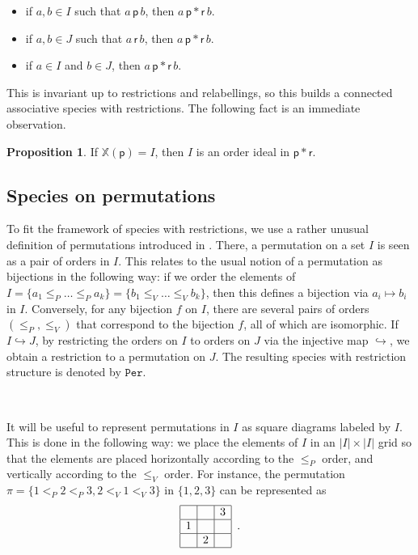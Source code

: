\documentclass[12pt, reqno]{amsart}
\theoremstyle{definition}
\newtheorem{prop}[thm]{Proposition}
\begin{document}
\begin{itemize}
\item if $a, b \in I$ such that $a \, \mathsf{p} \, b$, then $a \, \mathsf{p} \ast \mathsf{r} \, b$.

\item if $a, b \in J$ such that $a \, \mathsf{r} \, b$, then $a \, \mathsf{p} \ast \mathsf{r} \, b$.

\item if $a \in I$ and $b \in J$, then $a \, \mathsf{p} \ast \mathsf{r} \, b$.
\end{itemize}
This is invariant up to restrictions and relabellings, so this builds a connected associative species with restrictions. 
The following fact is an immediate observation.

\begin{prop}\label{prop:linorderideals}
If $\mathbb{X}(\mathsf{p}) = I$, then $I$ is an order ideal in $\mathsf{p} \ast \mathsf{r}$.
\end{prop}

\subsection{Species on permutations\label{sec:speciespermutation}}

To fit the framework of species with restrictions, we use a rather unusual definition of permutations introduced in \cite{albert2020two}.
There, a permutation on a set $I$ is seen as a pair of orders in $I$.
This relates to the usual notion of a permutation as bijections in the following way: if we order the elements of $I = \{a_1 \leq_P \dots \leq_P a_k \} = \{ b_1 \leq_V \dots \leq_V b_k \}$, then this defines a bijection via $a_i \mapsto b_i $ in $I$.
Conversely, for any bijection $f$ on $I$, there are several pairs of orders $(\leq_P, \leq_V)$ that correspond to the bijection $f$, all of which are isomorphic.
If $I \hookrightarrow J$, by restricting the orders on $I$ to orders on $J$ via the injective map $\hookrightarrow $, we obtain a restriction to a permutation on $J$.
The resulting species with restriction structure is denoted by $\mathtt{Per}$.

\

It will be useful to represent permutations in $I$ as square diagrams labeled by $I$.
This is done in the following way: we place the elements of $I$ in an $|I| \times |I|$ grid so that the elements are placed horizontally according to the $\leq_P$ order, and vertically according to the $\leq_V$ order.
For instance, the permutation $\pi = \{1<_P2<_P3 , 2<_V1<_V3\}$ in $\{1, 2, 3\}$ can be represented as 
\begin{equation}
\begin{array}{|c|c|c|}
	\hline & & 3 \\
    \hline 1 & &  \\
    \hline & 2 & \\
    \hline 
\end{array}\, \, \, .
\end{equation}
\end{document}
